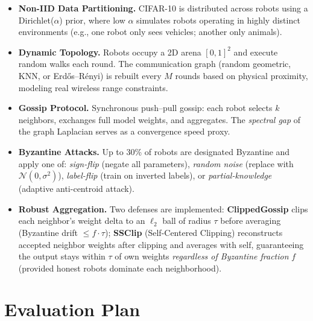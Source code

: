 \documentclass[10pt,letterpaper]{article}
\begin{document}
\begin{itemize}
  \item \textbf{Non-IID Data Partitioning.} CIFAR-10 is distributed across robots using a Dirichlet($\alpha$) prior, where low $\alpha$ simulates robots operating in highly distinct environments (e.g., one robot only sees vehicles; another only animals).

  \item \textbf{Dynamic Topology.} Robots occupy a 2D arena $[0,1]^2$ and execute random walks each round. The communication graph (random geometric, KNN, or Erd\H{o}s–R\'{e}nyi) is rebuilt every $M$ rounds based on physical proximity, modeling real wireless range constraints.

  \item \textbf{Gossip Protocol.} Synchronous push–pull gossip: each robot selects $k$ neighbors, exchanges full model weights, and aggregates. The \emph{spectral gap} of the graph Laplacian serves as a convergence speed proxy.

  \item \textbf{Byzantine Attacks.} Up to 30\% of robots are designated Byzantine and apply one of: \emph{sign-flip} (negate all parameters), \emph{random noise} (replace with $\mathcal{N}(0, \sigma^2)$), \emph{label-flip} (train on inverted labels), or \emph{partial-knowledge} (adaptive anti-centroid attack).

  \item \textbf{Robust Aggregation.} Two defenses are implemented: \textbf{ClippedGossip} \cite{farhadkhani2022} clips each neighbor's weight delta to an $\ell_2$ ball of radius $\tau$ before averaging (Byzantine drift $\leq f \cdot \tau$); \textbf{SSClip} (Self-Centered Clipping) \cite{fraboni2022} reconstructs accepted neighbor weights after clipping and averages with self, guaranteeing the output stays within $\tau$ of own weights \emph{regardless of Byzantine fraction} $f$ (provided honest robots dominate each neighborhood).
\end{itemize}

\section{Evaluation Plan}
\end{document}
